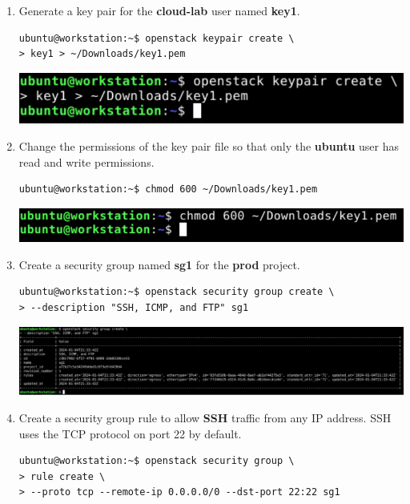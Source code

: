 \documentclass[letterpaper, 12pt]{article}
\begin{document}
\begin{enumerate}
    \item Generate a key pair for the \textbf{cloud-lab} user named \textbf{key1}.
\begin{lstlisting}
ubuntu@workstation:~$ openstack keypair create \
> key1 > ~/Downloads/key1.pem
\end{lstlisting}

    \begin{center}
        \includegraphics[width=\linewidth]{images/part1/step27.png}
    \end{center}

    \item Change the permissions of the key pair file so that only the \textbf{ubuntu} user has read and write
    permissions.
\begin{lstlisting}
ubuntu@workstation:~$ chmod 600 ~/Downloads/key1.pem
\end{lstlisting}

    \begin{center}
        \includegraphics[width=\linewidth]{images/part1/step28.png}
    \end{center}

    \item Create a security group named \textbf{sg1} for the \textbf{prod} project.
\begin{lstlisting}
ubuntu@workstation:~$ openstack security group create \
> --description "SSH, ICMP, and FTP" sg1
\end{lstlisting}    

    \begin{center}
        \includegraphics[width=\linewidth]{images/part1/step29.png}
    \end{center}

    \item Create a security group rule to allow \textbf{SSH} traffic from any IP address. SSH uses the TCP protocol on
    port 22 by default.
\begin{lstlisting}
ubuntu@workstation:~$ openstack security group \
> rule create \
> --proto tcp --remote-ip 0.0.0.0/0 --dst-port 22:22 sg1
\end{lstlisting}


\end{enumerate}
\end{document}
